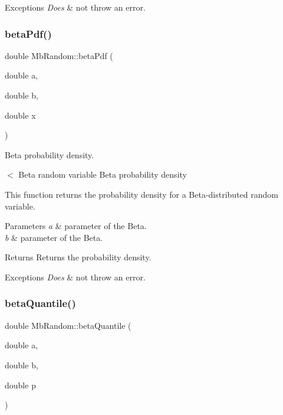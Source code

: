 \begin{DoxyExceptions}{Exceptions}
{\em Does} & not throw an error. \\
\hline
\end{DoxyExceptions}
\mbox{\label{class_mb_random_a5a2eb3c7ef62e1a6e537d1b530070de5}} 
\subsubsection{\texorpdfstring{betaPdf()}{betaPdf()}}
{\footnotesize\ttfamily double Mb\+Random\+::beta\+Pdf (\begin{DoxyParamCaption}\item[{double}]{a,  }\item[{double}]{b,  }\item[{double}]{x }\end{DoxyParamCaption})}



Beta probability density. 

$<$ Beta random variable Beta probability density

This function returns the probability density for a Beta-\/distributed random variable.


\begin{DoxyParams}{Parameters}
{\em a} & parameter of the Beta. \\
\hline
{\em b} & parameter of the Beta. \\
\hline
\end{DoxyParams}
\begin{DoxyReturn}{Returns}
Returns the probability density. 
\end{DoxyReturn}

\begin{DoxyExceptions}{Exceptions}
{\em Does} & not throw an error. \\
\hline
\end{DoxyExceptions}
\mbox{\label{class_mb_random_a09212ae872506d80046e9be639591248}} 
\subsubsection{\texorpdfstring{betaQuantile()}{betaQuantile()}}
{\footnotesize\ttfamily double Mb\+Random\+::beta\+Quantile (\begin{DoxyParamCaption}\item[{double}]{a,  }\item[{double}]{b,  }\item[{double}]{p }\end{DoxyParamCaption})}



